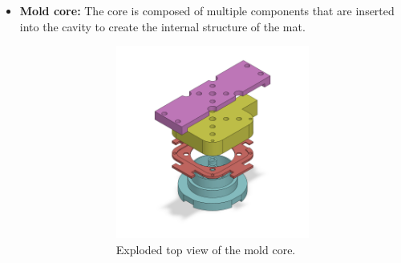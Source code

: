 \begin{itemize}
    \item \textbf{Mold core: } The core is composed of multiple components that are inserted into the cavity to create the internal structure of the mat.
    \begin{figure} %
        \centering
        \begin{subfigure}[b]{0.6\textwidth}
            \begin{subfigure}[b]{0.475\textwidth}
                \centering
                \includegraphics[width = 1\linewidth]{Chapters/Chapter5/Flexible_Mat_Prototypes/Figures/mold_core_exploded_top.PNG}
                \caption{Exploded top view of the mold core.}
            \end{subfigure}
            \hfill
            \begin{subfigure}[b]{0.475\textwidth}
                \centering

\end{subfigure}
\end{subfigure}
\end{figure}
\end{itemize}
